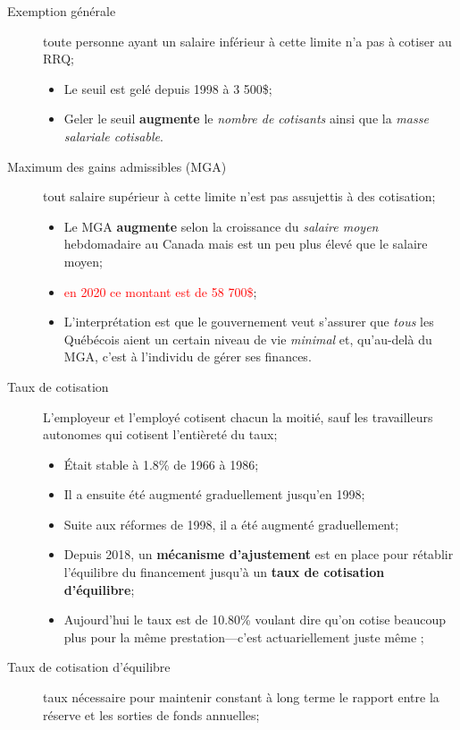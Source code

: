 \documentclass[10pt, french]{article}
\begin{document}
\begin{multicols*}{3}
\begin{description}
	\item[Exemption générale]	toute personne ayant un salaire inférieur à cette limite n'a pas à cotiser au RRQ;
		\begin{itemize}[leftmargin = *]
			\item	Le seuil est gelé depuis 1998 à 3 500\$;
			\item	Geler le seuil \textbf{augmente} le \textit{nombre de cotisants} ainsi que la \textit{masse salariale cotisable}.
		\end{itemize}
	\item[Maximum des gains admissibles (MGA)] tout salaire supérieur à cette limite n'est pas assujettis à des cotisation;
		\begin{itemize}[leftmargin = *]
			\item	Le MGA \textbf{augmente} selon la croissance du \textit{salaire moyen} hebdomadaire au Canada mais est un peu plus élevé que le salaire moyen;
			\item	\textcolor{red}{en 2020 ce montant est de 58 700\$};
			\item	L’interprétation est que le gouvernement veut s’assurer que \textit{tous} les Québécois aient un certain niveau de vie \textit{minimal} et, qu’au-delà du MGA, c’est à l’individu de gérer ses finances.
		\end{itemize}
	\item[Taux de cotisation]	L'employeur et l'employé cotisent chacun la moitié, sauf les travailleurs autonomes qui cotisent l'entièreté du taux;
		\begin{itemize}[leftmargin = *]
			\item	Était stable à 1.8\% de 1966 à 1986;
			\item	Il a ensuite été augmenté graduellement jusqu'en 1998;
			\item	Suite aux réformes de 1998, il a été augmenté graduellement;
			\item	Depuis 2018, un \textbf{mécanisme d'ajustement} est en place pour rétablir l'équilibre du financement jusqu'à un \textbf{taux de cotisation d'équilibre};
			\item	Aujourd'hui le taux est de 10.80\% voulant dire qu'on cotise beaucoup plus pour la même prestation---c'est actuariellement juste même ;
		\end{itemize}
	\item[Taux de cotisation d'équilibre]	taux nécessaire pour maintenir constant à long terme le rapport entre la réserve et les sorties de fonds annuelles;
		\begin{itemize}[leftmargin = *]

\end{itemize}
\end{description}
\end{multicols*}
\end{document}
